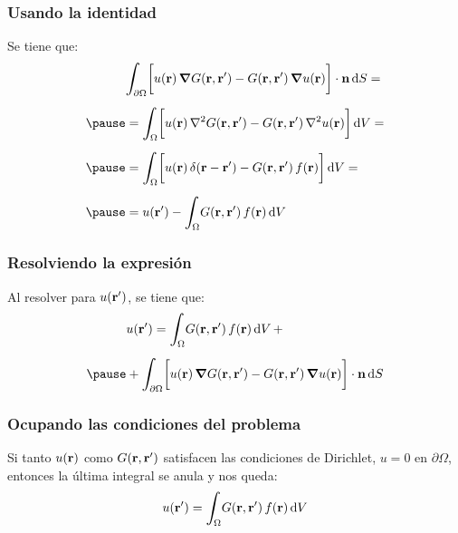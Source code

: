 \documentclass[12pt]{beamer}
\begin{document}
\begin{frame}
\frametitle{Usando la identidad}
Se tiene que:
\fontsize{12}{12}\selectfont
\begin{eqnarray}
\begin{aligned}[b]
&\scaleint{6ex}_{\bs \partial \Omega} \bigg[ u (\vb{r}) \, \grad{G (\vb{r}, \vb{\pderivada{r}})} - G (\vb{r}, \vb{\pderivada{r}}) \, \grad{u (\vb{r})} \bigg] \cdot \vb{n} \dd{S} = \\[0.5em] \pause
&= \scaleint{6ex}_{\bs \Omega} \bigg[ u (\vb{r}) \, \laplacian{G (\vb{r}, \vb{\pderivada{r}})} - G (\vb{r}, \vb{\pderivada{r}}) \, \laplacian{u (\vb{r})} \bigg] \dd{V} = \\[0.5em] \pause
&= \scaleint{6ex}_{\bs \Omega} \bigg[ u (\vb{r}) \, \delta (\vb{r} - \vb{\pderivada{r}}) - G (\vb{r}, \vb{\pderivada{r}}) \, f (\vb{r}) \bigg] \dd{V} = \\[0.5em] \pause
&= u (\vb{\pderivada{r}}) - \scaleint{6ex}_{\bs \Omega} G (\vb{r}, \vb{\pderivada{r}}) \, f (\vb{r}) \dd{V}
\end{aligned}
\label{eq:ecuacion_07_02}
\end{eqnarray}
\end{frame}

\begin{frame}
\frametitle{Resolviendo la expresión}
Al resolver para $u (\vb{\ensuremath{{r}^{\prime}}})$, se tiene que:
\pause
\begin{eqnarray}
\begin{aligned}[b]
&u (\vb{\pderivada{r}}) = \scaleint{6ex}_{\bs \Omega} G (\vb{r}, \vb{\pderivada{r}}) \, f (\vb{r}) \dd{V} + \\[0.5em] \pause
&+ \scaleint{6ex}_{\bs \partial \Omega} \bigg[ u (\vb{r}) \, \grad{G (\vb{r}, \vb{\pderivada{r}})} - G (\vb{r}, \vb{\pderivada{r}}) \, \grad{u (\vb{r})} \bigg] \cdot \vb{n} \dd{S}
\end{aligned}
\label{eq:ecuacion_07_03}
\end{eqnarray}
\end{frame}

\begin{frame}
\frametitle{Ocupando las condiciones del problema}
Si tanto $u (\vb{r})$ como $G (\vb{r}, \vb{\ensuremath{{r}^{\prime}}})$ satisfacen las condiciones de Dirichlet, $u = 0$ en $\partial \Omega$, \pause entonces la última integral se anula y nos queda:
\begin{align*}
u (\vb{\pderivada{r}}) = \scaleint{6ex}_{\bs \Omega} G (\vb{r}, \vb{\pderivada{r}}) \, f (\vb{r}) \dd{V}
\end{align*}
\end{frame}
\end{document}

